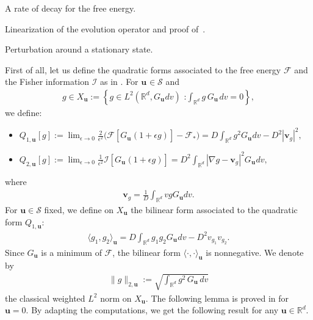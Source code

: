 \documentclass[reqno]{amsart} %
\begin{document}
\begin{section}{A rate of decay for the free energy.}
\begin{section}{Linearization of the evolution operator and proof of~\texorpdfstring{}{thm3}.}
\begin{subsection}{Perturbation around a stationary state.}


   First of all, let us define the quadratic forms associated to the free energy $\mathcal{F}$ and the Fisher information $\mathcal{I}$ as in \cite{Li2021}.
    For $\mathbf{u}_{} \in \mathcal{S}$ and
\begin{align*}
     g \in X_\mathbf{u}:=  \left\{ g \in L^2(\mathbb{R}^d,G_{\mathbf{u}_{}}dv) \text{ :} \int_{\mathbb{R}^d} g\,G_{\mathbf{u}_{\,}}dv=0 \right\},
\end{align*}
  we define:
    \begin{itemize}
        \item $Q_{1,\mathbf{u}_{}}[g]:= \lim_{\epsilon \rightarrow 0}{\frac{2}{\epsilon^2}\big( \mathcal{F}[G_{\mathbf{u}_{}}(1+ \epsilon g)]-\mathcal{F}_*\big)}=D \int_{\mathbb{R}^d} g^2 G_{\mathbf{u}_{}}dv -D^2 |\mathbf{v}_g|^2, $
        \item $Q_{2,\mathbf{u}_{}}[g]:= \lim_{\epsilon \rightarrow 0}{\frac{1}{\epsilon^2} \mathcal{I}[G_{\mathbf{u}_{}}(1+ \epsilon g)]}=D^2 \int_{\mathbb{R}^d} |\nabla g -\mathbf{v}_g|^2 G_{\mathbf{u}_{}}dv,$
    \end{itemize}
where \begin{align}
\label{vg}
    \mathbf{v}_g= \frac{1}{D} \int_{\mathbb{R}^d} vgG_{\mathbf{u}}dv.
\end{align} For $\mathbf{u} \in \mathcal{S}$ fixed, we define on $X_\mathbf{u} $ the bilinear form associated to the quadratic form $Q_{1,\mathbf{u}}$: 
 \begin{align}
 \label{definitionQ1}
    \langle g_1,g_2\rangle_{\mathbf{u}} = D \int_{\mathbb{R}^d}g_1g_2 G_{\mathbf{u}_{}}dv -D^2 v_{g_1}v_{g_2}.
    \end{align}
Since $G_{\mathbf{u}}$ is a minimum of $\mathcal{F}$, the bilinear form $\langle \cdot ,\cdot \rangle_{\mathbf{u}}$ is nonnegative. We denote by
\begin{align}
\label{normL2classique}
    \lVert g\rVert_{2,\mathbf{u}}:= \sqrt{\int_{\mathbb{R}^d}g^2\,G_\mathbf{u}\,dv}
\end{align} the classical weighted $L^2$ norm on $X_\mathbf{u}$. The following lemma is proved in \cite[Section~5.1]{Li2021} for $\mathbf{u}=0$. By adapting the computations, we get the following result for any  $\mathbf{u} \in \mathbb{R}^d.$


\end{subsection}
\end{section}
\end{section}
\end{document}
